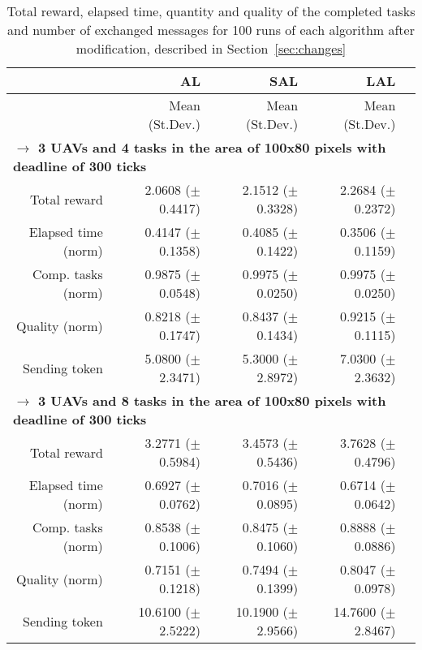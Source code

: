 \begin{table}%
	\small
	\fontsize{6}{6}\selectfont
	\centering
	\caption{Total reward, elapsed time, quantity and quality of the completed tasks and number of exchanged messages for 100 runs of each algorithm after modification, described in Section~\ref{sec:changes}}
	\label{table:table06}
	
	\begin{tabular}{rrrrr} \hline
		& AL
		& SAL
		& LAL \\ \hline 
		
		& Mean (St.Dev.)  & Mean (St.Dev.)  & Mean (St.Dev.)  \\ [1ex]
		
		\multicolumn{5}{l}{\textbf{$\longrightarrow$ 3 UAVs and 4 tasks in the area of 100x80 pixels with deadline of 300 ticks }} \\
	Total reward           & 2.0608   ($\pm$0.4417)  &  2.1512  ($\pm$0.3328) & 2.2684  ($\pm$0.2372)   \\
	Elapsed time (norm)    & 0.4147   ($\pm$0.1358)  &  0.4085  ($\pm$0.1422) & 0.3506  ($\pm$0.1159)    \\ 
	Comp. tasks (norm)     & 0.9875   ($\pm$0.0548)  &  0.9975  ($\pm$0.0250) & 0.9975  ($\pm$0.0250)    \\ 
	Quality (norm)         & 0.8218   ($\pm$0.1747)  &  0.8437  ($\pm$0.1434) & 0.9215  ($\pm$0.1115)   \\ 
	Sending token          &  5.0800  ($\pm$2.3471)  &  5.3000  ($\pm$2.8972) & 7.0300  ($\pm$2.3632)   \\ [1ex]
		
		\multicolumn{5}{l}{\textbf{$\longrightarrow$ 3 UAVs and 8 tasks in the area of 100x80 pixels with deadline of 300 ticks}} \\
	Total reward           & 3.2771   ($\pm$0.5984)  &  3.4573  ($\pm$0.5436) & 3.7628  ($\pm$0.4796)   \\
	Elapsed time (norm)    & 0.6927   ($\pm$0.0762)  &  0.7016  ($\pm$0.0895) & 0.6714  ($\pm$0.0642)    \\ 
	Comp. tasks (norm)     & 0.8538   ($\pm$0.1006)  &  0.8475  ($\pm$0.1060) & 0.8888  ($\pm$0.0886)    \\ 
	Quality (norm)         & 0.7151  ($\pm$0.1218)   &  0.7494  ($\pm$0.1399) & 0.8047  ($\pm$0.0978)  \\ 
	Sending token          & 10.6100 ($\pm$2.5222)   & 10.1900  ($\pm$2.9566) & 14.7600 ($\pm$2.8467)  \\ [1ex]
	

\end{tabular}
\end{table}

